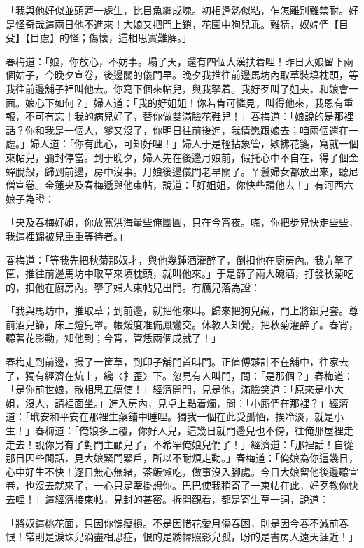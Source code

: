 \begin{showcontents}{}
「我與他好似並頭蓮一處生，比目魚纒成塊。初相逢熱似粘，乍怎離別難禁耐。好是怪奇哉這兩日他不進來！大娘又把門上鎖，花園中狗兒乖。難猜，奴婢們【目殳】【目慮】的怪；傷懷，這相思實難解。」

春梅道：「娘，你放心，不妨事。塌了天，還有四個大漢扶着哩！昨日大娘留下兩個姑子，今晚夕宣卷，後邊關的儀門早。晚夕我推往前邊馬坊內取草裝填枕頭，等我往前邊舖子裡叫他去。你寫下個來帖兒，與我拏着。我好歹叫了姐夫，和娘會一面。娘心下如何？」婦人道：「我的好姐姐！你若肯可憐見，叫得他來，我恩有重報，不可有忘！我的病兒好了，替你做雙滿臉花鞋兒！」春梅道：「娘說的是那裡話？你和我是一個人，爹又沒了，你明日往前後進，我情愿跟娘去；咱兩個還在一處。」婦人道：「你有此心，可知好哩！」婦人于是輕拈象管，欵拂花箋，寫就一個柬帖兒，彌封停當。到于晚夕，婦人先在後邊月娘前，假托心中不自在，得了個金蟬脫殼，歸到前邊，房中沒事。月娘後邊儀門老早關了。丫鬟婦女都放出來，聽尼僧宣卷。金蓮央及春梅遞與他柬帖，說道：「好姐姐，你快些請他去！」有河西六娘子為證：

「央及春梅好姐，你放寬洪海量些俺團圓，只在今宵夜。嗏，你把步兒快走些些，我這裡錦被兒重重等待者。」

春梅道：「等我先把秋菊那奴才，與他幾鍾酒灌醉了，倒扣他在廚房內。我方拏了筐，推往前邊馬坊中取草來填枕頭，就叫他來。」于是篩了兩大碗酒，打發秋菊吃的，扣他在廚房內。拏了婦人柬帖兒出門。有鴈兒落為證：

「我與馬坊中，推取草；到前邊，就把他來叫。歸來把狗兒藏，門上將鎖兒套。尊前酒兒篩，床上燈兒罩。帳煖度准備鳳鸞交。休教人知覺，把秋菊灌醉了。春宵，聽著花影動，知他到；今宵，管恁兩個成就了！」

春梅走到前邊，撮了一筐草，到印子舖門首叫門。正值傅夥計不在舖中，往家去了，獨有經濟在炕上，纔〈扌歪〉下。忽見有人叫門，問：「是那個？」春梅道：「是你前世娘，散相思五瘟使！」經濟開門，見是他，滿臉笑道：「原來是小大姐，沒人，請裡面坐。」進入房內，見卓上點着燭，問：「小廝們在那裡？」經濟道：「玳安和平安在那裡生藥舖中睡哩。獨我一個在此受孤恓，挨冷淡，就是小生！」春梅道：「俺娘多上覆，你好人兒，這幾日就門邊兒也不傍，往俺那屋裡走走去！說你另有了對門主顧兒了，不希罕俺娘兒們了！」經濟道：「那裡話！自從那日因些閒話，見大娘緊門緊戶，所以不耐煩走動。」春梅道：「俺娘為你這幾日，心中好生不快！逐日無心無緒，茶飯懶吃，做事沒入腳處。今日大娘留他後邊聽宣卷，也沒去就來了，一心只是牽掛想你。巴巴使我稍寄了一柬帖在此，好歹教你快去哩！」這經濟接柬帖，見封的甚密。拆開觀看，都是寄生草一詞，說道：

「將奴這桃花面，只因你憔瘦損。不是因惜花愛月傷春困，則是因今春不減前春恨！常則是淚珠兒滴盡相思症，恨的是綉幃照影兒孤，盼的是書房人遠天涯近！」


\end{showcontents}
